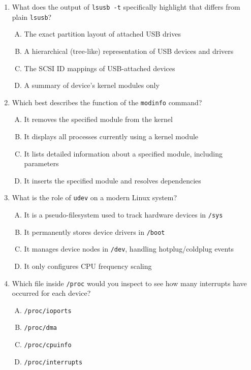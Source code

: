 \documentclass[12pt,a4paper]{report}
\begin{document}
\begin{enumerate}[1.]
\item What does the output of \texttt{lsusb -t} specifically highlight that differs from plain \texttt{lsusb}?
  \begin{enumerate}[A)]
    \item The exact partition layout of attached USB drives
    \item A hierarchical (tree-like) representation of USB devices and drivers
    \item The SCSI ID mappings of USB-attached devices
    \item A summary of device’s kernel modules only
  \end{enumerate}

\item Which best describes the function of the \texttt{modinfo} command?
  \begin{enumerate}[A)]
    \item It removes the specified module from the kernel
    \item It displays all processes currently using a kernel module
    \item It lists detailed information about a specified module, including parameters
    \item It inserts the specified module and resolves dependencies
  \end{enumerate}

\item What is the role of \texttt{udev} on a modern Linux system?
  \begin{enumerate}[A)]
    \item It is a pseudo-filesystem used to track hardware devices in \texttt{/sys}
    \item It permanently stores device drivers in \texttt{/boot}
    \item It manages device nodes in \texttt{/dev}, handling hotplug/coldplug events
    \item It only configures CPU frequency scaling
  \end{enumerate}

\item Which file inside \texttt{/proc} would you inspect to see how many interrupts have occurred for each device?
  \begin{enumerate}[A)]
    \item \texttt{/proc/ioports}
    \item \texttt{/proc/dma}
    \item \texttt{/proc/cpuinfo}
    \item \texttt{/proc/interrupts}
  \end{enumerate}


\end{enumerate}
\end{document}
